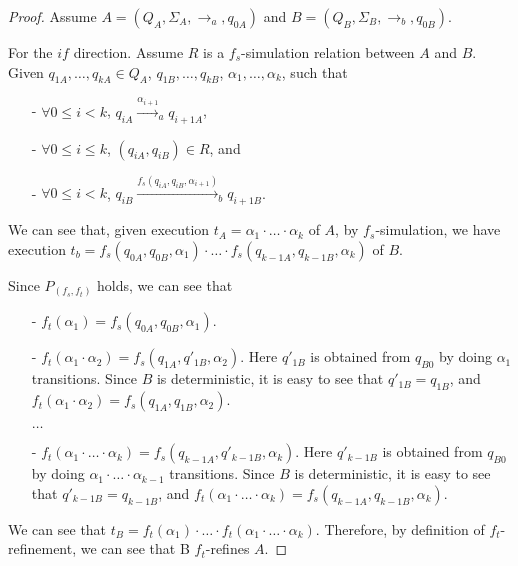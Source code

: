 \begin {proof}
Assume $A = (Q_A,\Sigma_A,\rightarrow_a,q_{0A})$ and $B = (Q_B,\Sigma_B,\rightarrow_b,q_{0B})$.

For the $\mathit{if}$ direction. Assume $R$ is a $f_s$-simulation relation between $A$ and $B$. Given $q_{1A},\ldots,q_{kA} \in Q_A$, $q_{1B},\ldots,q_{kB}$, $\alpha_1,\ldots,\alpha_k$, such that

\begin{itemize}
\setlength{\itemsep}{0.5pt}
\item[-] $\forall 0 \leq i < k$, $q_{iA} {\xrightarrow{\alpha_{i+1}}}_a q_{i+1A}$,

\item[-] $\forall 0 \leq i \leq k$, $(q_{iA},q_{iB}) \in R$, and

\item[-] $\forall 0 \leq i < k$, $q_{iB} {\xrightarrow{f_s(q_{iA},q_{iB},\alpha_{i+1})}}_b q_{i+1B}$.
\end{itemize}

We can see that, given execution $t_A = \alpha_1 \cdot \ldots \cdot \alpha_k$ of $A$, by $f_s$-simulation, we have execution $t_b = f_s(q_{0A},q_{0B},\alpha_1) \cdot \ldots \cdot f_s(q_{k-1A},q_{k-1B},\alpha_k)$ of $B$.

Since $P_{(f_s,f_t)}$ holds, we can see that

\begin{itemize}
\setlength{\itemsep}{0.5pt}
\item[-] $f_t(\alpha_1) = f_s(q_{0A},q_{0B},\alpha_1)$.

\item[-] $f_t(\alpha_1 \cdot \alpha_2) = f_s(q_{1A},q'_{1B},\alpha_2)$. Here $q'_{1B}$ is obtained from $q_{B0}$ by doing $\alpha_1$ transitions. Since $B$ is deterministic, it is easy to see that $q'_{1B} = q_{1B}$, and $f_t(\alpha_1 \cdot \alpha_2) = f_s(q_{1A},q_{1B},\alpha_2)$.

$\ldots$

\item[-] $f_t(\alpha_1 \cdot \ldots \cdot \alpha_k) = f_s(q_{k-1A},q'_{k-1B},\alpha_k)$. Here $q'_{k-1B}$ is obtained from $q_{B0}$ by doing $\alpha_1 \cdot \ldots \cdot \alpha_{k-1}$ transitions. Since $B$ is deterministic, it is easy to see that $q'_{k-1B} = q_{k-1B}$, and $f_t(\alpha_1 \cdot \ldots \cdot \alpha_k) = f_s(q_{k-1A},q_{k-1B},\alpha_k)$.
\end{itemize}

We can see that $t_B = f_t(\alpha_1) \cdot \ldots \cdot f_t(\alpha_1 \cdot \ldots \cdot \alpha_k)$. Therefore, by definition of $f_t$-refinement, we can see that B $f_t$-refines $A$.



\end{proof}
